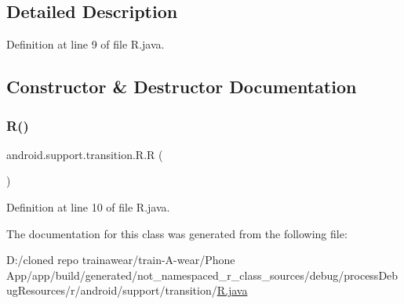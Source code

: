 \subsection{Detailed Description}


Definition at line 9 of file R.\+java.



\subsection{Constructor \& Destructor Documentation}
\mbox{\label{classandroid_1_1support_1_1transition_1_1_r_a49cf49904e6f9e2952a6503f2f307b08}} 
\subsubsection{\texorpdfstring{R()}{R()}}
{\footnotesize\ttfamily android.\+support.\+transition.\+R.\+R (\begin{DoxyParamCaption}{ }\end{DoxyParamCaption})\hspace{0.3cm}{\ttfamily [private]}}



Definition at line 10 of file R.\+java.


\begin{DoxyCode}{0}

\end{DoxyCode}


The documentation for this class was generated from the following file\+:\begin{DoxyCompactItemize}
\item 
D\+:/cloned repo trainawear/train-\/\+A-\/wear/\+Phone App/app/build/generated/not\+\_\+namespaced\+\_\+r\+\_\+class\+\_\+sources/debug/process\+Debug\+Resources/r/android/support/transition/\mbox{\hyperlink{process_debug_resources_2r_2android_2support_2transition_2_r_8java}{R.\+java}}\end{DoxyCompactItemize}

